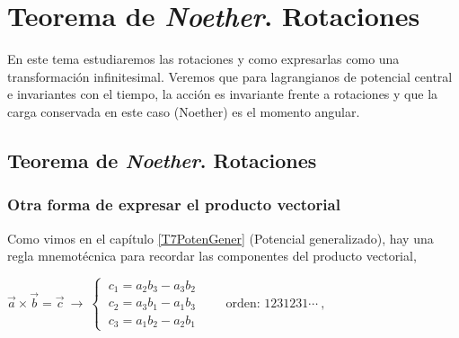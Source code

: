 \chapter{Teorema de \emph{Noether}. Rotaciones}



\vspace{10mm}
\begin{adjustwidth}{50pt}{50pt}
\begin{ejemplo}

En este tema estudiaremos las rotaciones y como expresarlas como una transformación infinitesimal. Veremos que para lagrangianos de potencial central e invariantes con el tiempo, la acción es invariante frente a rotaciones y que la carga conservada en este caso (Noether) es el momento angular.

\end{ejemplo}
\end{adjustwidth}
\vspace{-5mm}

\section {Teorema de \emph{Noether}. Rotaciones}

\subsection{Otra forma de expresar el producto vectorial}
\vspace{5mm}

Como vimos en el capítulo \ref{T7PotenGener} (Potencial generalizado), hay una regla mnemotécnica para recordar las componentes del producto vectorial,

$\vec a\times \vec b=\vec c \ \to \ 
\begin{cases}
\ c_1=a_2b_3-a_3b_2 \\ \  c_2=a_3b_1-a_1b_3 \\  \ c_3=a_1b_2-a_2b_1 	
\end{cases} \qquad \text{orden: } 1231231\cdots \ ,\ $ 

